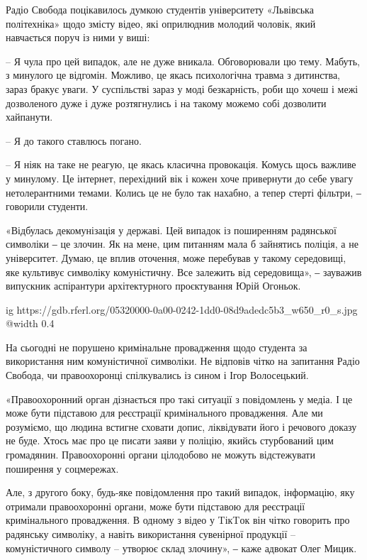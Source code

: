 \begin{multicols}{2}
Радіо Свобода поцікавилось думкою студентів університету «Львівська
політехніка» щодо змісту відео, які оприлюднив молодий чоловік, який навчається
поруч із ними у виші:

\begin{textQuote}
– Я чула про цей випадок, але не дуже вникала. Обговорювали цю тему. Мабуть, з
минулого це відгомін. Можливо, це якась психологічна травма з дитинства, зараз
бракує уваги. У суспільстві зараз у моді безкарність, роби що хочеш і межі
дозволеного дуже і дуже розтягнулись і на такому можемо собі дозволити
хайпанути.

– Я до такого ставлюсь погано.

– Я ніяк на таке не реагую, це якась класична провокація. Комусь щось важливе у
минулому. Це інтернет, перехідний вік і кожен хоче привернути до себе увагу
нетолерантними темами. Колись це не було так нахабно, а тепер стерті фільтри, ‒
говорили студенти.
\end{textQuote}

«Відбулась декомунізація у державі. Цей випадок із поширенням радянської
символіки ‒ це злочин. Як на мене, цим питанням мала б зайнятись поліція, а не
університет. Думаю, це вплив оточення, може перебував у такому середовищі, яке
культивує символіку комуністичну. Все залежить від середовища», ‒ зауважив
випускник аспірантури архітектурного проєктування Юрій Огоньок.

\ifcmt
  ig https://gdb.rferl.org/05320000-0a00-0242-1dd0-08d9adedc5b3_w650_r0_s.jpg
  @width 0.4
\fi



На сьогодні не порушено кримінальне провадження щодо студента за використання
ним комуністичної символіки. Не відповів чітко на запитання Радіо Свобода, чи
правоохоронці спілкувались із сином і Ігор Волосецький.

«Правоохоронний орган дізнається про такі ситуації з повідомлень у медіа. І це
може бути підставою для реєстрації кримінального провадження. Але ми розуміємо,
що людина встигне сховати допис, ліквідувати його і речового доказу не буде.
Хтось має про це писати заяви у поліцію, якийсь стурбований цим громадянин.
Правоохоронні органи цілодобово не можуть відстежувати поширення у соцмережах.

Але, з другого боку, будь-яке повідомлення про такий випадок, інформацію, яку
отримали правоохоронні органи, може бути підставою для реєстрації кримінального
провадження. В одному з відео у TікTок він чітко говорить про радянську
символіку, а навіть використання сувенірної продукції – комуністичного символу
– утворює склад злочину», ‒ каже адвокат Олег Мицик.


\end{multicols}
